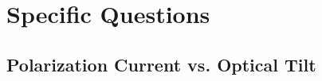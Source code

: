 \documentclass{tufte-handout}
\title{}
\author{Adam A. S. Green}
\date{}
\begin{document}

\newcommand{\leo}[1]{Professor Leo Radzihovsky}

\newcommand{\smapr}{$\mathrm{SmAP}_\mathrm{R}$}
\newcommand{\sma}{$\mathrm{SmA}$}
\newcommand{\smc}{$\mathrm{SmC}$}
\newcommand{\smapf}{$\mathrm{SmAP}_\mathrm{F}$}
\newcommand{\smapa}{$\mathrm{SmAP}_\mathrm{A}$}
\newcommand{\smcapalp}{$\mathrm{SmC}_\textrm{A}\textrm{P}_\mathrm{\alpha}$}
\newcommand{\smapalp}{$\mathrm{SmAP}_\mathrm{\alpha}$}
\newcommand{\smcapf}{$\mathrm{SmC}_\textrm{A}\textrm{P}_\mathrm{F}$}
\newcommand{\smcspf}{$\mathrm{SmC}_\textrm{S}\textrm{P}_\mathrm{F}$}
\newcommand{\smcspa}{$\mathrm{SmC}_\textrm{S}\textrm{P}_\mathrm{A}$}
\newcommand{\smcapa}{$\mathrm{SmC}_\textrm{A}\textrm{P}_\mathrm{A}$}
\newcommand{\smca}{$\mathrm{SmC}_\textrm{A}$}
\newcommand{\smcs}{$\mathrm{SmC}_\textrm{S}$}
\newcommand{\smcapaprime}{$\mathrm{SmC}_\textrm{A}\textrm{P}_\mathrm{A'}$}
\newcommand{\smaprM}{\mathrm{SmAP}_\mathrm{R}}
\newcommand{\smaM}{\mathrm{SmA}}
\newcommand{\smapfM}{\mathrm{SmAP}_\mathrm{F}}
\newcommand{\smapaM}{\mathrm{SmAP}_\mathrm{A}}
\newcommand{\smapalpM}{\mathrm{SmAP}_\mathrm{\alpha}}
\newcommand{\smcapfM}{\mathrm{SmC}_\textrm{A}\textrm{P}_\mathrm{F}}
\newcommand{\smcspfM}{\mathrm{SmC}_\textrm{S}\textrm{P}_\mathrm{F}}
\newcommand{\smcspaM}{\mathrm{SmC}_\textrm{S}\textrm{P}_\mathrm{A}}
\newcommand{\smcapaM}{\mathrm{SmC}_\textrm{A}\textrm{P}_\mathrm{A}}

\newcommand{\smcsM}{\mathrm{SmC}_\textrm{S}}
\newcommand{\smcapaprimeM}{\mathrm{SmC}_\textrm{A}\textrm{P}_\mathrm{A`}}

\newcommand{\nsix}{\textbf{n-16}}
\newcommand{\nfour}{\textbf{PAL30}}
\maketitle

\begin{abstract}
\noindent 
Though \nfour{phi} has been well characterized by our study, there are several
open questions that remain for me--- some of which are specific to \nfour{phi},
and some of which are more general to the implications of the phases that we
discovered.
\end{abstract}
\section{Specific Questions}
\subsection{Polarization Current vs. Optical Tilt}
\end{document}

